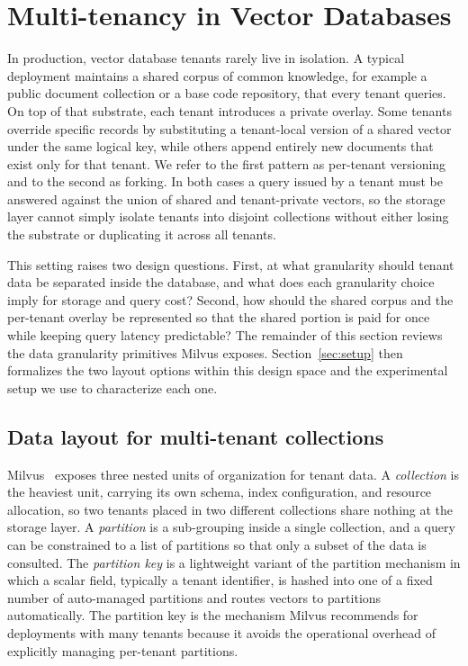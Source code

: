 \section{Multi-tenancy in Vector Databases}
\label{sec:multitenancy}

In production, vector database tenants rarely live in isolation. A
typical deployment maintains a shared corpus of common knowledge,
for example a public document collection or a base code repository,
that every tenant queries. On top of that substrate, each tenant
introduces a private overlay. Some tenants override specific
records by substituting a tenant-local version of a shared vector
under the same logical key, while others append entirely new
documents that exist only for that tenant. We refer to the first
pattern as per-tenant versioning and to the second as forking. In
both cases a query issued by a tenant must be answered against the
union of shared and tenant-private vectors, so the storage layer
cannot simply isolate tenants into disjoint collections without
either losing the substrate or duplicating it across all tenants.

This setting raises two design questions. First, at what
granularity should tenant data be separated inside the database,
and what does each granularity choice imply for storage and query
cost? Second, how should the shared corpus and the per-tenant
overlay be represented so that the shared portion is paid for once
while keeping query latency predictable? The remainder of this
section reviews the data granularity primitives Milvus exposes.
Section~\ref{sec:setup} then formalizes the two layout options within this design space and the experimental setup we use to
characterize each one.

\subsection{Data layout for multi-tenant collections}

Milvus~\cite{wang2021milvus} exposes three nested units of
organization for tenant data. A \emph{collection} is the heaviest
unit, carrying its own schema, index configuration, and resource
allocation, so two tenants placed in two different collections share
nothing at the storage layer. A \emph{partition} is a sub-grouping
inside a single collection, and a query can be constrained to a list
of partitions so that only a subset of the data is consulted. The
\emph{partition key} is a lightweight variant of the partition
mechanism in which a scalar field, typically a tenant identifier, is
hashed into one of a fixed number of auto-managed partitions and
routes vectors to partitions automatically. The partition key is the
mechanism Milvus recommends for deployments with many tenants
because it avoids the operational overhead of explicitly managing
per-tenant partitions.

